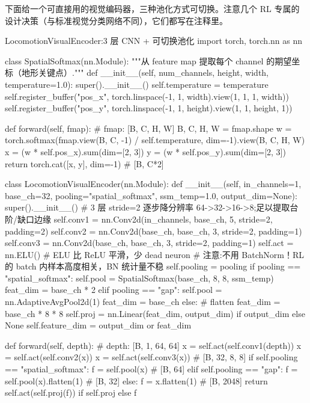 下面给一个可直接用的视觉编码器，三种池化方式可切换。注意几个 RL 专属的设计决策（与标准视觉分类网络不同），它们都写在注释里。

\begin{codebox}[Python]{LocomotionVisualEncoder:3 层 CNN + 可切换池化}
import torch, torch.nn as nn

class SpatialSoftmax(nn.Module):
    """从 feature map 提取每个 channel 的期望坐标（地形关键点）."""
    def __init__(self, num_channels, height, width, temperature=1.0):
        super().__init__()
        self.temperature = temperature
        self.register_buffer("pos_x",
            torch.linspace(-1, 1, width).view(1, 1, 1, width))
        self.register_buffer("pos_y",
            torch.linspace(-1, 1, height).view(1, 1, height, 1))

    def forward(self, fmap):                    # fmap: [B, C, H, W]
        B, C, H, W = fmap.shape
        w = torch.softmax(fmap.view(B, C, -1) / self.temperature,
                          dim=-1).view(B, C, H, W)
        x = (w * self.pos_x).sum(dim=[2, 3])
        y = (w * self.pos_y).sum(dim=[2, 3])
        return torch.cat([x, y], dim=-1)         # [B, C*2]

class LocomotionVisualEncoder(nn.Module):
    def __init__(self, in_channels=1, base_ch=32,
                 pooling="spatial_softmax", ssm_temp=1.0, output_dim=None):
        super().__init__()
        # 3 层 stride=2 逐步降分辨率 64->32->16->8;足以提取台阶/缺口边缘
        self.conv1 = nn.Conv2d(in_channels, base_ch, 5, stride=2, padding=2)
        self.conv2 = nn.Conv2d(base_ch, base_ch, 3, stride=2, padding=1)
        self.conv3 = nn.Conv2d(base_ch, base_ch, 3, stride=2, padding=1)
        self.act = nn.ELU()                       # ELU 比 ReLU 平滑，少 dead neuron
        # 注意:不用 BatchNorm！RL 的 batch 内样本高度相关，BN 统计量不稳
        self.pooling = pooling
        if pooling == "spatial_softmax":
            self.pool = SpatialSoftmax(base_ch, 8, 8, ssm_temp)
            feat_dim = base_ch * 2
        elif pooling == "gap":
            self.pool = nn.AdaptiveAvgPool2d(1)
            feat_dim = base_ch
        else:                                     # flatten
            feat_dim = base_ch * 8 * 8
        self.proj = nn.Linear(feat_dim, output_dim) if output_dim else None
        self.feature_dim = output_dim or feat_dim

    def forward(self, depth):                     # depth: [B, 1, 64, 64]
        x = self.act(self.conv1(depth))
        x = self.act(self.conv2(x))
        x = self.act(self.conv3(x))               # [B, 32, 8, 8]
        if self.pooling == "spatial_softmax":
            f = self.pool(x)                      # [B, 64]
        elif self.pooling == "gap":
            f = self.pool(x).flatten(1)           # [B, 32]
        else:
            f = x.flatten(1)                      # [B, 2048]
        return self.act(self.proj(f)) if self.proj else f
\end{codebox}

